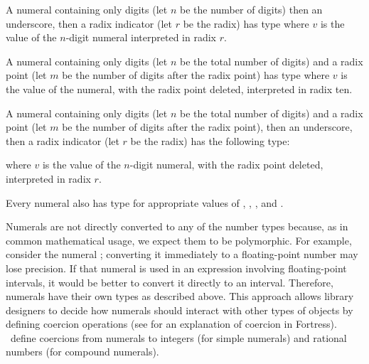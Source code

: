 
A numeral containing only digits (let $n$ be the number of
digits) then an underscore, then a radix indicator (let $r$ be the
radix) has type 
where $v$ is
the value of the $n$-digit numeral interpreted in radix $r$.

A numeral containing only digits (let $n$ be the total number
of digits) and a radix point (let $m$ be the number of digits after
the radix point) has type
 where $v$ is
the value of the numeral, with the radix point deleted,
interpreted in radix ten.

A numeral containing only digits (let $n$ be the total number
of digits) and a radix point (let $m$ be the number of digits after
the radix point), then an underscore, then a radix indicator (let $r$
be the radix) has the following type:
\begin{Fortress}
\end{Fortress}
where $v$ is the value of the $n$-digit numeral, with the radix point
deleted, interpreted in radix $r$.

Every numeral also has type
for appropriate values of , , , and .


Numerals are not directly converted to any of the number types
because, as in common mathematical usage,
we expect them to be polymorphic.
For example, consider the numeral ;
converting it immediately to a floating-point number
may lose precision.
If that numeral is used in an expression
involving floating-point intervals,
it would be better to convert it directly to an interval.
Therefore, numerals have their own types as described above.
This approach allows library designers to decide how numerals should
interact with other types of objects by defining coercion operations
(see  for an explanation of coercion
in Fortress).
\Library\ define coercions
from numerals to integers (for simple numerals)
and rational numbers (for compound numerals).


